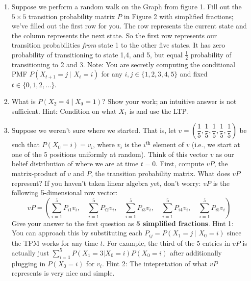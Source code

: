 \documentclass[12pt]{article}
\renewcommand{\|}{\mid}
\begin{document}
\begin{enumerate}
\pagebreak

\begin{enumerate}
    \item Suppose we perform a random walk on the Graph from figure 1. Fill out the $5\times 5$ transition probability matrix $P$ in Figure 2 with simplified fractions; we've filled out the first row for you. The row represents the current state and the column represents the next state. So the first row represents our transition probabilities \textit{from} state 1 to the other five states. It has zero probability of transitioning to state 1,4, and 5, but equal $\frac{1}{2}$ probability of transitioning to 2 and 3.  Note: You are secretly computing the conditional PMF $P(X_{t+1}=j\mid X_t=i)$ for any $i,j\in\{1,2,3,4,5\}$ and fixed $t\in\{0,1,2,\dots\}$.
    \item What is $P(X_2=4\mid X_0=1)$? Show your work; an intuitive answer is not sufficient. Hint: Condition on what $X_1$ is and use the LTP. %
    \item Suppose we weren't sure where we started. That is, let $v=\left(\dfrac{1}{5},\dfrac{1}{5},\dfrac{1}{5},\dfrac{1}{5},\dfrac{1}{5}\right)$ be such that $P(X_0=i)=v_i$, where $v_{i}$ is the $i^{\text{th}}$ element of $v$ (i.e., we start at one of the 5 positions uniformly at random). Think of this vector $v$ as our belief distribution of where we are at time $t=0$. First, compute $vP$, the matrix-product of $v$ and $P$, the transition probability matrix. What does $v P$ represent? If you haven't taken linear algebra yet, don't worry: $v P$ is the following 5-dimensional row vector:
    $$v P=\left(\sum_{i=1}^5{P_{i1}v_i},\quad\sum_{i=1}^5{P_{i2}v_i},\quad\sum_{i=1}^5{P_{i3}v_i},\quad\sum_{i=1}^5{P_{i4}v_i},\quad\sum_{i=1}^5{P_{i5}v_i}\right)$$
    Give your answer to the first question as \textbf{5 simplified fractions}.
    \newline Hint 1: You can approach this by substituting each $P_{ij}=P(X_1=j\mid X_0=i)$ since the TPM works for any time $t$. For example, the third of the 5 entries in $vP$ is actually just $\sum_{i=1}^5{P(X_1=3|X_0=i)P(X_0=i)}$ after additionally plugging in $P(X_0=i)$ for $v_i$.
    \newline Hint 2: The intepretation of what $vP$ represents is very nice and simple.

\end{enumerate}
\end{enumerate}
\end{document}
